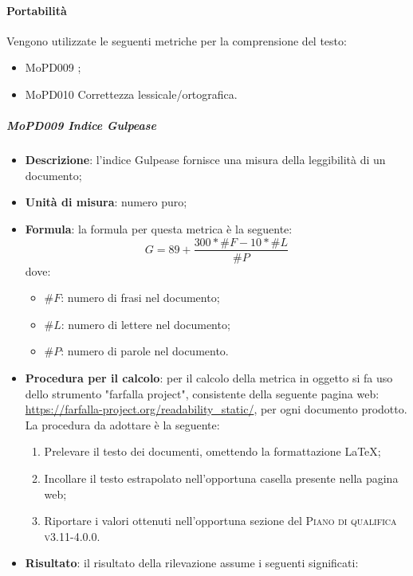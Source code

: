\documentclass[../norme-di-progetto.tex]{subfiles}
\begin{document}
\paragraph{Portabilità}
Vengono utilizzate le seguenti metriche per la comprensione del testo:
\begin{itemize}
  \item MoPD009 ;
  \item MoPD010 Correttezza lessicale/ortografica.
\end{itemize}
\subparagraph{MoPD009 Indice Gulpease}
\begin{itemize}
  \item \textbf{Descrizione}: l'indice Gulpease fornisce una misura della leggibilità di un documento;
  \item \textbf{Unità di misura}: numero puro;
  \item \textbf{Formula}: la formula per questa metrica è la seguente:
  \begin{displaymath}
    G=89+\frac{300*\#F - 10*\#L}{\#P}
  \end{displaymath}
  dove:
  \begin{itemize}
    \item $ \#F $: numero di frasi nel documento;
    \item $ \#L $: numero di lettere nel documento;
    \item $ \#P $: numero di parole nel documento.
  \end{itemize}
  \item \textbf{Procedura per il calcolo}: per il calcolo della metrica in oggetto si fa uso dello strumento "farfalla project", consistente della seguente pagina web: \href{https://farfalla-project.org/readability_static/}{https://farfalla-project.org/readability\_static/}, per ogni documento prodotto. La procedura da adottare è la seguente:
  \begin{enumerate}
    \item Prelevare il testo dei documenti, omettendo la formattazione \LaTeX;
    \item Incollare il testo estrapolato nell'opportuna casella presente nella pagina web;
    \item Riportare i valori ottenuti nell'opportuna sezione del \textsc{Piano di qualifica v3.11-4.0.0}.
  \end{enumerate}
  \item \textbf{Risultato}: il risultato della rilevazione assume i seguenti significati:
  \begin{itemize}

\end{itemize}
\end{itemize}
\end{document}
